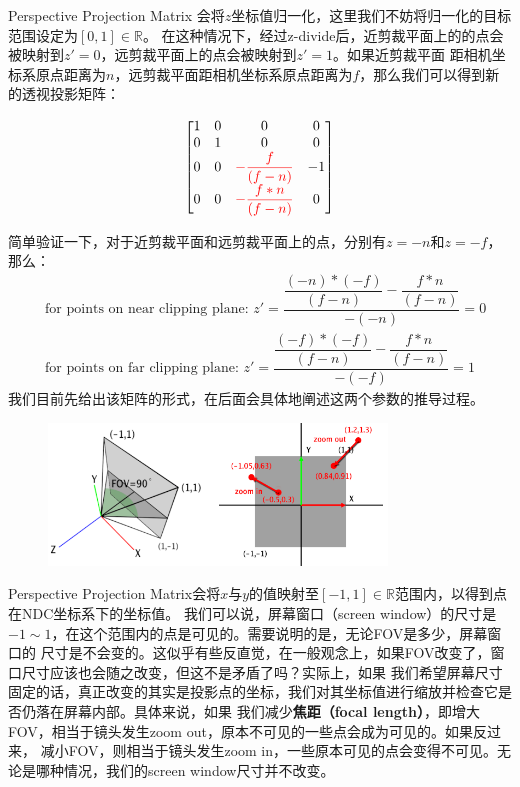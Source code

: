 \documentclass[12pt]{article}
\begin{document}
\indent{}Perspective Projection Matrix 会将$z$坐标值归一化，这里我们不妨将归一化的目标范围设定为$[0,1]\in\mathbb{R}$。
在这种情况下，经过z-divide后，近剪裁平面上的的点会被映射到$z'=0$，远剪裁平面上的点会被映射到$z'=1$。如果近剪裁平面
距相机坐标系原点距离为$n$，远剪裁平面距相机坐标系原点距离为$f$，那么我们可以得到新的透视投影矩阵：

\begin{displaymath}
\begin{bmatrix}
1 & 0 & 0 & 0 \\
0 & 1 & 0 & 0 \\
0 & 0 & \color{red}{-\dfrac{f}{(f-n)}} & -1\\
0 & 0 & \color{red}{-\dfrac{f*n}{(f-n)}} & 0\\
\end{bmatrix}
\end{displaymath}

\noindent{}简单验证一下，对于近剪裁平面和远剪裁平面上的点，分别有$z=-n$和$z=-f$，那么：
\begin{align*}
&\textrm{for points on near clipping plane: }z' = \dfrac{\dfrac{(-n)*(-f)}{(f-n)} - \dfrac{f*n}{(f-n)}}{-(-n)} = 0\\
&\textrm{for points on far clipping plane: }z' = \dfrac{\dfrac{(-f)*(-f)}{(f-n)} - \dfrac{f*n}{(f-n)}}{-(-f)} = 1
\end{align*}
\noindent{}我们目前先给出该矩阵的形式，在后面会具体地阐述这两个参数的推导过程。

\begin{figure}[h]
\centering
\includegraphics[width=9cm]{./imgs/camsetup1.png}
\end{figure}

\indent{}Perspective Projection Matrix会将$x$与$y$的值映射至$[-1,1]\in\mathbb{R}$范围内，以得到点在NDC坐标系下的坐标值。
我们可以说，屏幕窗口（screen window）的尺寸是$-1\sim 1$，在这个范围内的点是可见的。需要说明的是，无论FOV是多少，屏幕窗口的
尺寸是不会变的。这似乎有些反直觉，在一般观念上，如果FOV改变了，窗口尺寸应该也会随之改变，但这不是矛盾了吗？实际上，如果
我们希望屏幕尺寸固定的话，真正改变的其实是投影点的坐标，我们对其坐标值进行缩放并检查它是否仍落在屏幕内部。具体来说，如果
我们减少\textbf{焦距（focal length）}，即增大FOV，相当于镜头发生zoom out，原本不可见的一些点会成为可见的。如果反过来，
减小FOV，则相当于镜头发生zoom in，一些原本可见的点会变得不可见。无论是哪种情况，我们的screen window尺寸并不改变。
\end{document}
